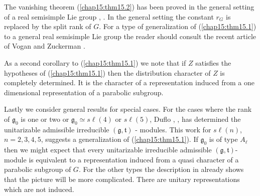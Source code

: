The vanishing theorem (\ref{chap15:thm15.2}) has been proved in the
general setting of 
a real semisimple Lie group \cite{key4}, \cite{key39}. In the general
setting the constant $r_G$ is replaced by the split rank of $G$. For a
type of generalization of (\ref{chap15:thm15.1}) to a general real
semisimple Lie group 
the reader should consult the recent article of Vogan and Zuckerman
\cite{key35}.  

As a second corollary to (\ref{chap15:thm15.1}) we note that if $Z$
satisfies the 
hypotheses of (\ref{chap15:thm15.1}) then the distribution character of $Z$ is
completely determined. It is the character of a representation induced
from a one dimensional representation of a parabolic subgroup. 

Lastly we consider general results for special cases. For the cases
where the rank of $\mathfrak{g}_0$ is one or two or $\mathfrak{g}_0
\simeq s\ell (4)$ or $s\ell(5)$, Duflo \cite{key10}, \cite{key11},
has determined the unitarizable admissible irreducible $(\mathfrak{g},
\mathfrak{t})$ - modules. This work for $s\ell(n)$, $n = 2,3,4,5$, 
suggests a generalization of (\ref{chap15:thm15.1}). If
$\mathfrak{g}_0$ is of type 
$A_\ell$ then we might expect that every unitarizable irreducible
admissible $(\mathfrak{g}, \mathfrak{t})$-module is equivalent to a
representation induced from a quasi character of a parabolic subgroup
of $G$. For the other types the description in \cite{key10} already
shows that the picture will be more complicated. There are unitary
representations which are not induced. 
 

